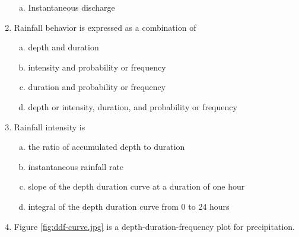 \documentclass[12pt]{article}
\begin{document}
\begin{enumerate}
\begin{enumerate}[a)]
\item Instantaneous discharge
\end{enumerate}
\item Rainfall behavior is expressed as a combination of 
\begin{enumerate}[a)]
\item depth and duration
\item intensity and probability or frequency
\item duration and probability or frequency
\item depth or intensity, duration, and probability or frequency
\end{enumerate}
\item Rainfall intensity is 
\begin{enumerate}[a)]
\item the ratio of accumulated depth to duration
\item instantaneous rainfall rate
\item slope of the depth duration curve at a duration of one hour
\item integral of the depth duration curve from 0 to 24 hours
\end{enumerate}
\newpage
\item Figure \ref{fig:ddf-curve.jpg} is a depth-duration-frequency plot for precipitation.


\end{enumerate}
\end{document}

